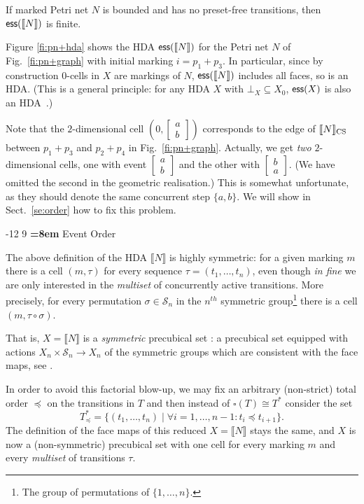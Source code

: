 \documentclass[runningheads,envcountsame]{llncs}
\makeatletter
\newcommand*\ess{\textup{\textsf{ess}}}
\newcommand*\loset[1]{\left[\begin{smallmatrix}#1\end{smallmatrix}\right]}
\newcommand*\sem[1]{\llbracket #1\rrbracket}
\newcommand*\mcal[1]{\mathcal{#1}}
\renewcommand\section{\@startsection{section}{1}{\z@}%
  {-12\p@ \@plus -3\p@ \@minus -3\p@}%
  {9\p@ \@plus 3\p@ \@minus 3\p@}%
  {\normalfont\large\bfseries\boldmath
    \rightskip=\z@ \@plus 8em\pretolerance=10000 }}
\makeatother
\begin{document}
\begin{proposition}
  \label{pr:finiteness}
  If marked Petri net $N$ is bounded and has no preset-free transitions,
  then $\ess(\sem{N})$ is finite.
\end{proposition}

Figure \ref{fi:pn+hda} shows the HDA $\ess(\sem{N})$ for the  Petri net $N$ of Fig.~\ref{fi:pn+graph} with initial marking $i = p_1+p_3$.
In particular, since by construction $0$-cells in $X$ are markings of $N$, $\ess(\sem{N})$ includes all faces, so is an HDA.
(This is a general principle: for any HDA $X$ with $\bot_X\subseteq X_0$, $\ess(X)$ is also an HDA~\cite{DBLP:journals/fuin/FahrenbergZ24}.)

Note that the $2$-dimensional cell $(0, \loset{a\\b})$ corresponds to the edge of $\sem{N}_{\textup{CS}}$ between $p_1+p_3$ and $p_2+p_4$ in Fig.~\ref{fi:pn+graph}.
Actually,
we get \emph{two} $2$-dimensional cells,
one with event $\loset{a\\b}$ and the other with $\loset{b\\a}$.
(We have omitted the second in the geometric realisation.)
This is somewhat unfortunate, as they should denote the same concurrent step $\{a, b\}$.
We will show in Sect.~\ref{se:order} how to fix this problem.

\section{Event Order}
\label{se:order}
\label{sec:example}

The above definition of the HDA $\sem{N}$ is highly symmetric:
for a given marking $m$ there is a cell $(m, \tau)$
for every sequence $\tau=(t_1,\dotsc, t_n)$,
even though \textit{in fine} we are only interested in the \emph{multiset} of concurrently active transitions.
More precisely, for every permutation $\sigma\in \mcal{S}_n$ in the $n^{th}$ symmetric group\footnote{%
  The group of permutations of $\{1,\dots, n\}$.}
there is a cell $(m, \tau\circ \sigma)$.

That is, $X=\sem{N}$ is a \emph{symmetric} precubical set \cite{GrandisM03-Site, DBLP:journals/corr/abs-2409-04612}:
a precubical set equipped with actions $X_n\times \mcal{S}_n\to X_n$ of the symmetric groups
which are consistent with the face maps, see \cite[Sect.~6]{GrandisM03-Site}.

In order to avoid this factorial blow-up,
we may fix an arbitrary (non-strict) total order $\preccurlyeq$ on the transitions in $T$
and then instead of $\square(T)\cong T^*$ consider the set
\begin{equation*}
  T_\preccurlyeq^* = \{(t_1,\dotsc, t_n)\mid \forall i=1,\dotsc, n-1: t_i\preccurlyeq t_{i+1}\}.
\end{equation*}
The definition of the face maps of this reduced $X=\sem{N}$ stays the same,
and $X$ is now a (non-symmetric) precubical set
with one cell for every marking $m$ and every \emph{multiset} of transitions $\tau$.
\end{document}
